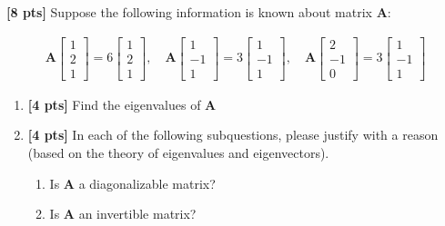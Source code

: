 \documentclass[11pt,addpoints,answers]{exam}
\numberwithin{equation}{section} %
\numberwithin{figure}{section} %
\numberwithin{table}{section} %
\begin{document}
\begin{questions}
    \question \textbf{[8 pts]} Suppose the following information is known about matrix $\mathbf{A}$:
    
    \begin{align*}
    \mathbf{A} \begin{bmatrix}
        1 \\2 \\1
    \end{bmatrix} = 6\begin{bmatrix}
        1 \\ 2 \\1
    \end{bmatrix}, \quad \mathbf{A}\begin{bmatrix}
        1 \\ -1 \\ 1
    \end{bmatrix} = 3 \begin{bmatrix}
        1 \\ -1 \\ 1
    \end{bmatrix}, \quad \mathbf{A} \begin{bmatrix}
        2 \\ -1 \\ 0
    \end{bmatrix} = 3 \begin{bmatrix}
        1 \\ -1 \\ 1
    \end{bmatrix}
    \end{align*}
    \begin{enumerate}[label=\Roman*]
        \item \textbf{[4 pts]} Find the eigenvalues of $\mathbf{A}$
        \item \textbf{[4 pts]} In each of the following subquestions, please justify with a reason (based on the theory of eigenvalues and eigenvectors).
        \begin{enumerate}
            \item Is $\mathbf{A}$ a diagonalizable matrix?
            \item Is $\mathbf{A}$ an invertible matrix?
        \end{enumerate}


\end{enumerate}
\end{questions}
\end{document}
